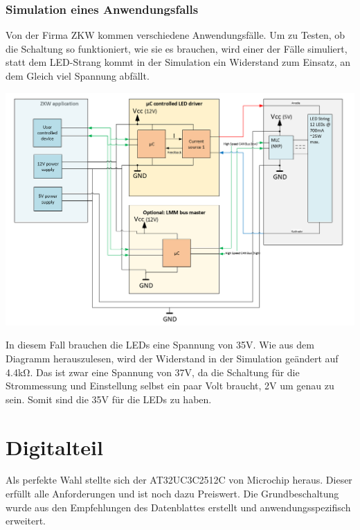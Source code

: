 \documentclass[paper=a4, 12pt]{scrreprt}
\begin{document}
			\subsubsection{Simulation eines Anwendungsfalls}\hfill \break
			Von der Firma ZKW kommen verschiedene Anwendungsfälle. Um zu Testen, ob die Schaltung so funktioniert, wie sie es brauchen, wird einer der Fälle simuliert, statt dem LED-Strang kommt in der Simulation ein Widerstand zum Einsatz, an dem Gleich viel Spannung abfällt.
			\begin{adjustbox}{center,caption={Anwendungsfall von ZKW},label={fig:anwendungsfall},nofloat=figure,vspace=\bigskipamount}
				\includegraphics[width=\textwidth]{img/SimulierterAnwendungsfall.PNG}
			\end{adjustbox}
			In diesem Fall brauchen die LEDs eine Spannung von 35V. Wie aus dem Diagramm herauszulesen, wird der Widerstand in der Simulation geändert auf 4.4kΩ. Das ist zwar eine Spannung von 37V, da die Schaltung für die Strommessung und Einstellung selbst ein paar Volt braucht, 2V um genau zu sein. Somit sind die 35V für die LEDs zu haben. 
			\newpage
			
	\section{Digitalteil}
	Als perfekte Wahl stellte sich der AT32UC3C2512C von Microchip heraus. Dieser erfüllt alle Anforderungen und ist noch dazu Preiswert. Die Grundbeschaltung wurde aus den Empfehlungen des Datenblattes erstellt und anwendungsspezifisch erweitert.
\end{document}
